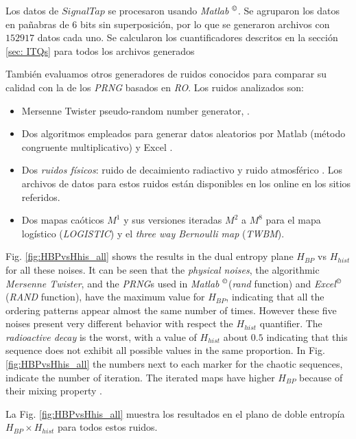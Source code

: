 Los datos de $SignalTap$ se procesaron usando \emph{Matlab} $^\copyright$.
Se agruparon los datos en pañabras de $6$ bits sin superposición, por lo que se generaron archivos con $152917$ datos cada uno.
Se calcularon los cuantificadores descritos en la sección \ref{sec: ITQs} para todos los archivos generados

También evaluamos otros generadores de ruidos conocidos para comparar su calidad con la de los \emph{PRNG} basados en \emph{RO}.
Los ruidos analizados son:

\begin{itemize}
  \item Mersenne Twister pseudo-random number generator, \cite{Matsumoto1998}.
  \item Dos algoritmos empleados para generar datos aleatorios por Matlab (método congruente multiplicativo) \cite{Matlab} y Excel \cite{McLeod1985}.
  \item Dos \emph{ruidos físicos}: ruido de decaimiento radiactivo \cite{Walker2001} y ruido atmosférico \cite{Haahr}.
  Los archivos de datos para estos ruidos están disponibles en los online en los sitios referidos.
  \item Dos mapas caóticos $M^1$ y sus versiones iteradas $M^2$ a $M^8$ \cite{DeMicco2008} para el mapa logístico (\emph{LOGISTIC}) y el \emph{three way Bernoulli map} (\emph{TWBM}).
\end{itemize}

Fig. \ref{fig:HBPvsHhis_all} shows the results in the dual entropy plane $H_{BP}$ vs $H_{hist}$ for all these noises.
It can be seen that the \emph{physical noises}, the algorithmic \emph{Mersenne Twister}, and the \emph{PRNG}s used in \emph{Matlab} $^\copyright$(\emph{rand} function) and \emph{Excel}$^\copyright$ (\emph{RAND} function), have the  maximum value for $H_{BP}$, indicating that all the ordering patterns appear almost the same number of times. However these five noises present very different behavior with respect the $H_{hist}$ quantifier. The \emph{radioactive decay} is the worst, with a value of $H_{hist}$ about $0.5$ indicating that this sequence does not exhibit all possible values in the same proportion. In Fig. \ref{fig:HBPvsHhis_all} the numbers next to each marker for the chaotic sequences, indicate the number of iteration. The iterated maps have higher $H_{BP}$ because of their mixing property \cite{DeMicco2008}.

La Fig. \ref{fig:HBPvsHhis_all} muestra los resultados en el plano de doble entropía $H_ {BP} \times H_{hist}$ para todos estos ruidos.


